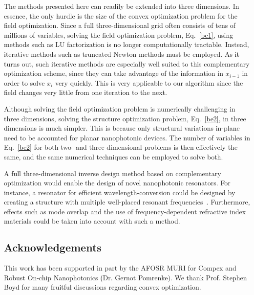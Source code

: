 The methods presented here can readily be extended into three dimensions. In essence, the only hurdle is the size of the convex optimization problem for the field optimization. Since a full three-dimensional grid often consists of tens of millions of variables, solving the field optimization problem, Eq.~\eqref{be1}, using methods such as LU factorization is no longer computationally tractable. Instead, iterative methods such as truncated Newton methods must be employed. As it turns out, such iterative methods are especially well suited to this complementary optimization scheme, since they can take advantage of the information in $x_{i-1}$ in order to solve $x_i$ very quickly. This is very applicable to our algorithm since the field changes very little from one iteration to the next. 

Although solving the field optimization problem is numerically challenging in three dimensions, solving the structure optimization problem, Eq.~\eqref{be2}, in three dimensions is much simpler. This is because only structural variations in-plane need to be accounted for planar nanophotonic devices. The number of variables in Eq.~\eqref{be2} for both two- and three-dimensional problems is then effectively the same, and the same numerical techniques can be employed to solve both.

A full three-dimensional inverse design method based on complementary optimization would enable the design of novel nanophotonic resonators. For instance, a resonator for efficient wavelength-conversion could be designed by creating a structure with multiple well-placed resonant frequencies~\cite{Riv09}. Furthermore, effects such as mode overlap and the use of frequency-dependent refractive index materials could be taken into account with such a method. 


\subsection*{Acknowledgements}
This work has been supported in part by the AFOSR MURI for Compex and Robust On-chip Nanophotonics (Dr. Gernot Pomrenke).
We thank Prof. Stephen Boyd for many fruitful discussions regarding convex optimization.

